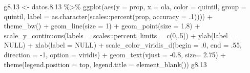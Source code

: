 \documentclass[
  12pt,
]{book}
\newenvironment{Shaded}{\begin{snugshade}}{\end{snugshade}}
\newcommand{\AttributeTok}[1]{\textcolor[rgb]{0.77,0.63,0.00}{#1}}
\newcommand{\ConstantTok}[1]{\textcolor[rgb]{0.00,0.00,0.00}{#1}}
\newcommand{\DecValTok}[1]{\textcolor[rgb]{0.00,0.00,0.81}{#1}}
\newcommand{\FloatTok}[1]{\textcolor[rgb]{0.00,0.00,0.81}{#1}}
\newcommand{\FunctionTok}[1]{\textcolor[rgb]{0.00,0.00,0.00}{#1}}
\newcommand{\NormalTok}[1]{#1}
\newcommand{\OtherTok}[1]{\textcolor[rgb]{0.56,0.35,0.01}{#1}}
\newcommand{\SpecialCharTok}[1]{\textcolor[rgb]{0.00,0.00,0.00}{#1}}
\newcommand{\StringTok}[1]{\textcolor[rgb]{0.31,0.60,0.02}{#1}}
\begin{document}
\begin{Shaded}
\begin{Highlighting}[]
\NormalTok{g8}\FloatTok{.13} \OtherTok{\textless{}{-}}\NormalTok{ datos.}\FloatTok{8.13} \SpecialCharTok{\%\textgreater{}\%} 
  \FunctionTok{ggplot}\NormalTok{(}\FunctionTok{aes}\NormalTok{(}\AttributeTok{y =}\NormalTok{ prop, }\AttributeTok{x =}\NormalTok{ ola, }\AttributeTok{color =}\NormalTok{ quintil, }\AttributeTok{group =}\NormalTok{ quintil,}
             \AttributeTok{label =} \FunctionTok{as.character}\NormalTok{(scales}\SpecialCharTok{::}\FunctionTok{percent}\NormalTok{(prop, }\AttributeTok{accuracy =}\NormalTok{ .}\DecValTok{1}\NormalTok{)))) }\SpecialCharTok{+}
  \FunctionTok{theme\_bw}\NormalTok{() }\SpecialCharTok{+}   
  \FunctionTok{geom\_line}\NormalTok{(}\AttributeTok{size =} \DecValTok{1}\NormalTok{) }\SpecialCharTok{+}
  \FunctionTok{geom\_point}\NormalTok{(}\AttributeTok{size =} \FloatTok{1.8}\NormalTok{) }\SpecialCharTok{+}
  \FunctionTok{scale\_y\_continuous}\NormalTok{(}\AttributeTok{labels =}\NormalTok{ scales}\SpecialCharTok{::}\NormalTok{percent,}
                     \AttributeTok{limits =} \FunctionTok{c}\NormalTok{(}\DecValTok{0}\NormalTok{,.}\DecValTok{5}\NormalTok{)) }\SpecialCharTok{+}
  \FunctionTok{ylab}\NormalTok{(}\AttributeTok{label =} \ConstantTok{NULL}\NormalTok{) }\SpecialCharTok{+}
  \FunctionTok{xlab}\NormalTok{(}\AttributeTok{label =} \ConstantTok{NULL}\NormalTok{) }\SpecialCharTok{+}
  \FunctionTok{scale\_color\_viridis\_d}\NormalTok{(}\AttributeTok{begin =}\NormalTok{ .}\DecValTok{0}\NormalTok{, }\AttributeTok{end =}\NormalTok{ .}\DecValTok{55}\NormalTok{, }\AttributeTok{direction =} \SpecialCharTok{{-}}\DecValTok{1}\NormalTok{, }\AttributeTok{option =} \StringTok{\textquotesingle{}viridis\textquotesingle{}}\NormalTok{) }\SpecialCharTok{+}
  \FunctionTok{geom\_text}\NormalTok{(}\AttributeTok{vjust =} \SpecialCharTok{{-}}\FloatTok{0.8}\NormalTok{,}
            \AttributeTok{size=} \FloatTok{2.75}\NormalTok{) }\SpecialCharTok{+}
  \FunctionTok{theme}\NormalTok{(}\AttributeTok{legend.position =} \StringTok{\textquotesingle{}top\textquotesingle{}}\NormalTok{,}
        \AttributeTok{legend.title =} \FunctionTok{element\_blank}\NormalTok{())}
\NormalTok{g8}\FloatTok{.13}
\end{Highlighting}
\end{Shaded}
\end{document}
